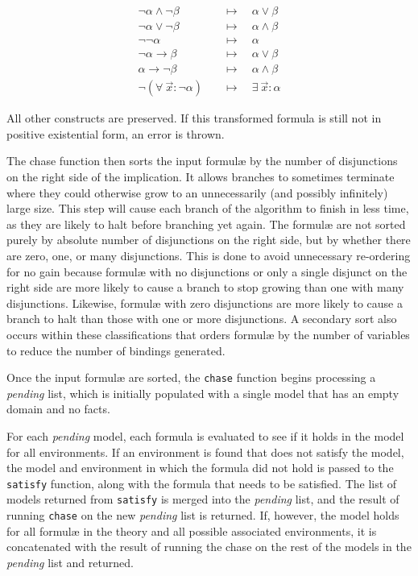 		\begin{align*}
		\neg\alpha \wedge \neg\beta         \quad & \mapsto \quad \alpha \vee \beta        \\
		\neg\alpha \vee \neg\beta           \quad & \mapsto \quad \alpha \wedge \beta      \\
		\neg\neg\alpha                      \quad & \mapsto \quad \alpha                   \\
		\neg\alpha \to \beta                \quad & \mapsto \quad \alpha \vee \beta        \\
		\alpha \to \neg\beta                \quad & \mapsto \quad \alpha \wedge \beta      \\
		\neg(\forall\ \vec{x} : \neg\alpha) \quad & \mapsto \quad \exists\ \vec{x} : \alpha
		\end{align*}

		All other constructs are preserved. If this transformed formula is still
		not in positive existential form, an error is thrown.

		The chase function then sorts the input formul{\ae} by the number of
		disjunctions on the right side of the implication. It allows branches
		to sometimes terminate where they could otherwise grow to an
		unnecessarily (and possibly infinitely) large size. This step will
		cause each branch of the algorithm to finish in less time, as they are
		likely to halt before branching yet again. The formul{\ae} are not
		sorted purely by absolute number of disjunctions on the right side, but
		by whether there are zero, one, or many disjunctions. This is done to
		avoid unnecessary re-ordering for no gain because formul{\ae} with no
		disjunctions or only a single disjunct on the right side are more
		likely to cause a branch to stop growing than one with many
		disjunctions. Likewise, formul{\ae} with zero disjunctions are more
		likely to cause a branch to halt than those with one or more
		disjunctions. A secondary sort also occurs within these classifications
		that orders formul{\ae} by the number of variables to reduce the number
		of bindings generated.

		Once the input formul{\ae} are sorted, the {\tt chase} function begins
		processing a \emph{pending} list, which is initially populated with a
		single model that has an empty domain and no facts.

		For each \emph{pending} model, each formula is evaluated to see if it
		holds in the model for all environments. If an environment is found
		that does not satisfy the model, the model and environment in which the
		formula did not hold is passed to the {\tt satisfy} function, along
		with the formula that needs to be satisfied. The list of models
		returned from {\tt satisfy} is merged into the \emph{pending} list, and
		the result of running {\tt chase} on the new \emph{pending} list is
		returned. If, however, the model holds for all formul{\ae} in the
		theory and all possible associated environments, it is concatenated
		with the result of running the chase on the rest of the models in the
		\emph{pending} list and returned.

